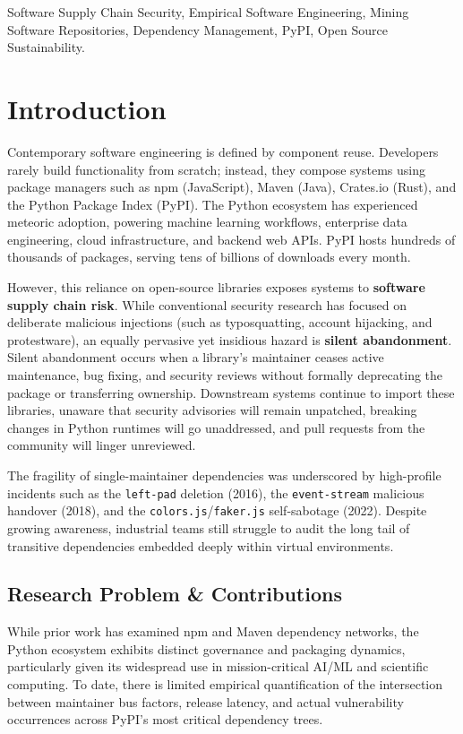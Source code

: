\documentclass[conference]{IEEEtran}
\begin{document}
\begin{IEEEkeywords}
Software Supply Chain Security, Empirical Software Engineering, Mining Software Repositories, Dependency Management, PyPI, Open Source Sustainability.
\end{IEEEkeywords}

\section{Introduction}

Contemporary software engineering is defined by component reuse. Developers rarely build functionality from scratch; instead, they compose systems using package managers such as npm (JavaScript), Maven (Java), Crates.io (Rust), and the Python Package Index (PyPI). The Python ecosystem has experienced meteoric adoption, powering machine learning workflows, enterprise data engineering, cloud infrastructure, and backend web APIs. PyPI hosts hundreds of thousands of packages, serving tens of billions of downloads every month.

However, this reliance on open-source libraries exposes systems to \textbf{software supply chain risk}. While conventional security research has focused on deliberate malicious injections (such as typosquatting, account hijacking, and protestware), an equally pervasive yet insidious hazard is \textbf{silent abandonment}. Silent abandonment occurs when a library's maintainer ceases active maintenance, bug fixing, and security reviews without formally deprecating the package or transferring ownership. Downstream systems continue to import these libraries, unaware that security advisories will remain unpatched, breaking changes in Python runtimes will go unaddressed, and pull requests from the community will linger unreviewed.

The fragility of single-maintainer dependencies was underscored by high-profile incidents such as the \texttt{left-pad} deletion (2016), the \texttt{event-stream} malicious handover (2018), and the \texttt{colors.js}/\texttt{faker.js} self-sabotage (2022). Despite growing awareness, industrial teams still struggle to audit the long tail of transitive dependencies embedded deeply within virtual environments.

\subsection{Research Problem \& Contributions}

While prior work has examined npm and Maven dependency networks, the Python ecosystem exhibits distinct governance and packaging dynamics, particularly given its widespread use in mission-critical AI/ML and scientific computing. To date, there is limited empirical quantification of the intersection between maintainer bus factors, release latency, and actual vulnerability occurrences across PyPI's most critical dependency trees.
\end{document}
